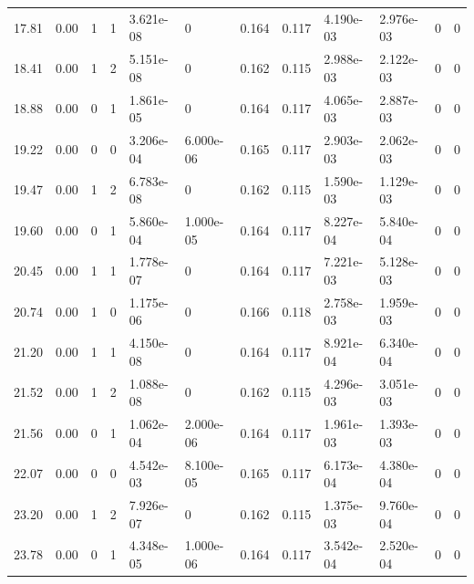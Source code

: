 \documentclass[preview]{standalone}
\begin{document}
{{\begin{tabular}{L{1.2cm}C{1.2cm} C{0.3cm}C{0.5cm} C{1.4cm}C{1.4cm} C{1.4cm}C{1.4cm} C{1.6cm}C{1.6cm} C{1.6cm}C{1.6cm}}
  17.81  &  0.00  & 1     &  1 &  3.621e-08  & 0  &  0.164&   0.117& 4.190e-03 & 2.976e-03   &  0 & 0  \\ 
  18.41  &  0.00  & 1     &  2 &  5.151e-08  & 0  &  0.162&   0.115& 2.988e-03 & 2.122e-03   &  0 & 0  \\ 
  18.88  &  0.00  & 0     &  1 &  1.861e-05  & 0  &  0.164&   0.117& 4.065e-03 & 2.887e-03   &  0 & 0  \\ 
  19.22  &  0.00  & 0     &  0 &  3.206e-04  & 6.000e-06  &  0.165&   0.117& 2.903e-03 & 2.062e-03   &  0 & 0  \\ 
  19.47  &  0.00  & 1     &  2 &  6.783e-08  & 0  &  0.162&   0.115& 1.590e-03 & 1.129e-03   &  0 & 0  \\ 
  19.60  &  0.00  & 0     &  1 &  5.860e-04  & 1.000e-05  &  0.164&   0.117& 8.227e-04 & 5.840e-04   &  0 & 0  \\ 
  20.45  &  0.00  & 1     &  1 &  1.778e-07  & 0  &  0.164&   0.117& 7.221e-03 & 5.128e-03   &  0 & 0  \\ 
  20.74  &  0.00  & 1     &  0 &  1.175e-06  & 0  &  0.166&   0.118& 2.758e-03 & 1.959e-03   &  0 & 0  \\ 
  21.20  &  0.00  & 1     &  1 &  4.150e-08  & 0  &  0.164&   0.117& 8.921e-04 & 6.340e-04   &  0 & 0  \\ 
  21.52  &  0.00  & 1     &  2 &  1.088e-08  & 0  &  0.162&   0.115& 4.296e-03 & 3.051e-03   &  0 & 0  \\ 
  21.56  &  0.00  & 0     &  1 &  1.062e-04  & 2.000e-06  &  0.164&   0.117& 1.961e-03 & 1.393e-03   &  0 & 0  \\ 
  22.07  &  0.00  & 0     &  0 &  4.542e-03  & 8.100e-05  &  0.165&   0.117& 6.173e-04 & 4.380e-04   &  0 & 0  \\ 
  23.20  &  0.00  & 1     &  2 &  7.926e-07  & 0  &  0.162&   0.115& 1.375e-03 & 9.760e-04   &  0 & 0  \\ 
  23.78  &  0.00  & 0     &  1 &  4.348e-05  & 1.000e-06  &  0.164&   0.117& 3.542e-04 & 2.520e-04   &  0 & 0  \\ 
\hline 
\end{tabular} 

}}
\end{document}
